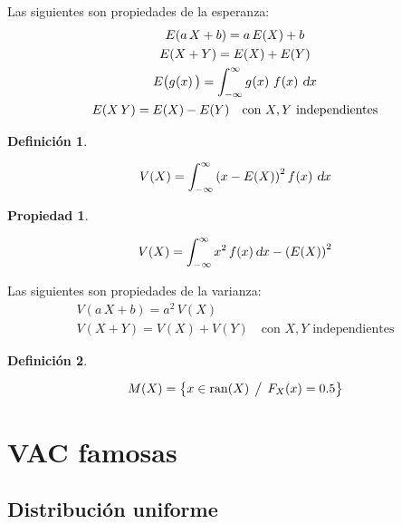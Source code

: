 \documentclass[a5paper,12pt,twoside]{book}
\newtheorem{defn}{{Definición}}[chapter]
\newtheorem{prop}{{Propiedad}}[chapter]
\begin{document}
Las siguientes son propiedades de la esperanza:
\begin{gather*}
    E(a \, X + b) = a \, E(X) + b
    \\
    E(X+Y) = E(X) + E(Y)
    \\
    E \big( \fx[g]{x} \big) = \int_{-\infty}^{\infty} \fx[g]{x} \, \fx{x} \, \dif x
    \\
    E(X \, Y) = E(X) - E(Y) \quad \text{con $X,Y$ independientes}
\end{gather*}

\begin{mdframed}[style=MyFrame1]
    \begin{defn}
    \end{defn}
    \begin{equation*}
        V(X) = \int_{-\infty}^{\infty} \bb{x - E(X)}^2 \fx{x} \, \dif x
    \end{equation*}
\end{mdframed}

\begin{mdframed}[style=MyFrame1]
    \begin{prop}
    \end{prop}
    \begin{equation*}
        V(X) = \int_{-\infty}^{\infty} x^2 \, f(x) \, \dif x - \bb{E(X)}^2
    \end{equation*}
\end{mdframed}

Las siguientes son propiedades de la varianza:
\begin{gather*}
    V(a \, X+b) = a^2 \, V(X)
    \\
    V(X+Y) = V(X) + V(Y) \quad \text{con $X, Y$ independientes}
\end{gather*}

\begin{mdframed}[style=MyFrame1]
    \begin{defn}
    \end{defn}
    \begin{equation*}
        M(X) = \braces{x \in \ran(X) \tq F_X(x) = 0.5}
    \end{equation*}
\end{mdframed}


\section{VAC famosas}


\subsection{Distribución uniforme}
\end{document}
